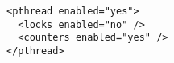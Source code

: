 \begin{verbatim}
<pthread enabled="yes">
  <locks enabled="no" />
  <counters enabled="yes" />
</pthread>
\end{verbatim}
